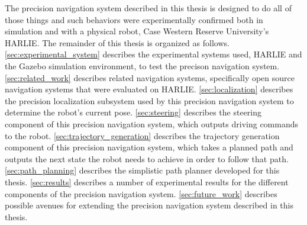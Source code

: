 The precision navigation system described in this thesis is designed to do all of those things and such behaviors were experimentally confirmed both in simulation and with a physical robot, Case Western Reserve University's HARLIE. The remainder of this thesis is organized as follows. \autoref{sec:experimental_system} describes the experimental systems used, HARLIE and the Gazebo simulation environment, to test the precison navigation system. \autoref{sec:related_work} describes related navigation systems, specifically open source navigation systems that were evaluated on HARLIE. \autoref{sec:localization} describes the precision localization subsystem used by this precision navigation system to determine the robot's current pose. \autoref{sec:steering} describes the steering component of this precision navigation system, which outputs driving commands to the robot. \autoref{sec:trajectory_generation} describes the trajectory generation component of this precision navigation system, which takes a planned path and outputs the next state the robot needs to achieve in order to follow that path. \autoref{sec:path_planning} describes the simplistic path planner developed for this thesis. \autoref{sec:results} describes a number of experimental results for the different components of the precision navigation system. \autoref{sec:future_work} describes possible avenues for extending the precision navigation system described in this thesis.
